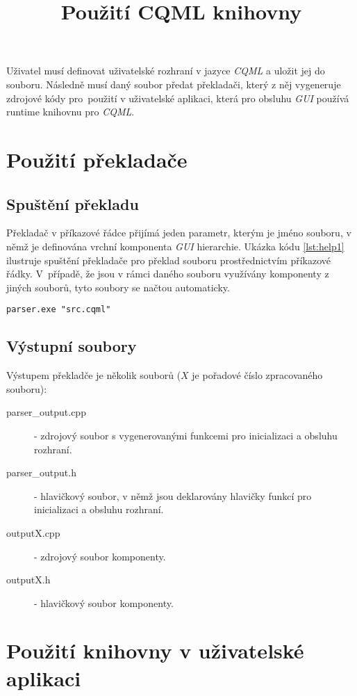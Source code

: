 \documentclass{article}
\begin{document}
\title{Použití CQML knihovny}
\date{}
\maketitle


Uživatel musí definovat uživatelské rozhraní v jazyce \textit{CQML} a uložit jej do souboru. Následně musí daný soubor předat překladači, který z něj vygeneruje zdrojové kódy pro~použití v uživatelské aplikaci, která pro obsluhu \textit{GUI} používá runtime knihovnu pro \textit{CQML}.
\section{Použití překladače}
\subsection{Spuštění překladu}
Překladač v příkazové řádce přijímá jeden parametr, kterým je jméno souboru, v němž je definována vrchní komponenta \textit{GUI} hierarchie. Ukázka kódu \ref{lst:help1} ilustruje spuštění překladače pro překlad souboru  prostřednictvím příkazové řádky. V~případě, že jsou v rámci daného souboru využívány komponenty z jiných souborů, tyto soubory se načtou automaticky.
\begin{lstlisting}[frame=single,caption=Spuštění překladače pomocí příkazové řádky.,label=lst:help1]
parser.exe "src.cqml"
\end{lstlisting}
\subsection{Výstupní soubory}
Výstupem překladče je několik souborů ($X$ je pořadové číslo zpracovaného souboru):
\begin{description}
\item[parser\_output.cpp] - zdrojový soubor s vygenerovanými funkcemi pro inicializaci a obsluhu rozhraní.
\item[parser\_output.h] - hlavičkový soubor, v němž jsou deklarovány hlavičky funkcí pro inicializaci a obsluhu rozhraní.
\item[outputX.cpp] - zdrojový soubor komponenty.
\item[outputX.h] - hlavičkový soubor komponenty.
\end{description}
\section[Použití knihovny]{Použití knihovny v uživatelské aplikaci}
\end{document}
